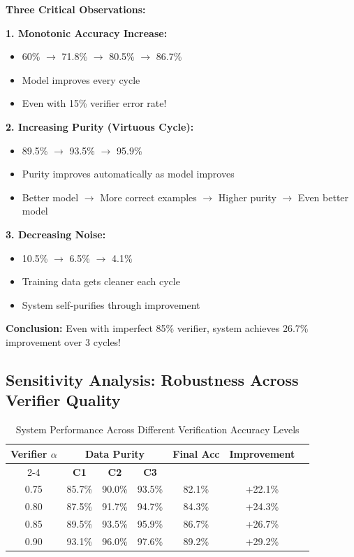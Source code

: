 \documentclass[12pt,a4paper]{article}
\theoremstyle{definition}
\begin{document}
\begin{keyinsightbox}
\textbf{Three Critical Observations:}

\textbf{1. Monotonic Accuracy Increase:}
\begin{itemize}
    \item 60\% $\rightarrow$ 71.8\% $\rightarrow$ 80.5\% $\rightarrow$ 86.7\%
    \item Model improves every cycle
    \item Even with 15\% verifier error rate!
\end{itemize}

\textbf{2. Increasing Purity (Virtuous Cycle):}
\begin{itemize}
    \item 89.5\% $\rightarrow$ 93.5\% $\rightarrow$ 95.9\%
    \item Purity improves automatically as model improves
    \item Better model $\rightarrow$ More correct examples $\rightarrow$ Higher purity $\rightarrow$ Even better model
\end{itemize}

\textbf{3. Decreasing Noise:}
\begin{itemize}
    \item 10.5\% $\rightarrow$ 6.5\% $\rightarrow$ 4.1\%
    \item Training data gets cleaner each cycle
    \item System self-purifies through improvement
\end{itemize}

\textbf{Conclusion:} Even with imperfect 85\% verifier, system achieves 26.7\% improvement over 3 cycles!
\end{keyinsightbox}

\subsection{Sensitivity Analysis: Robustness Across Verifier Quality}

\begin{table}[htbp]
\centering
\caption{System Performance Across Different Verification Accuracy Levels}
\small
\begin{tabular}{ccccccc}
\toprule
\multirow{2}{*}{\textbf{Verifier $\alpha$}} & \multicolumn{3}{c}{\textbf{Data Purity}} & \multirow{2}{*}{\textbf{Final Acc}} & \multirow{2}{*}{\textbf{Improvement}} \\
\cmidrule(lr){2-4}
& \textbf{C1} & \textbf{C2} & \textbf{C3} & & \\
\midrule
0.75 & 85.7\% & 90.0\% & 93.5\% & 82.1\% & +22.1\% \\
0.80 & 87.5\% & 91.7\% & 94.7\% & 84.3\% & +24.3\% \\
0.85 & 89.5\% & 93.5\% & 95.9\% & 86.7\% & +26.7\% \\
0.90 & 93.1\% & 96.0\% & 97.6\% & 89.2\% & +29.2\% \\
\bottomrule
\end{tabular}
\end{table}
\end{document}
